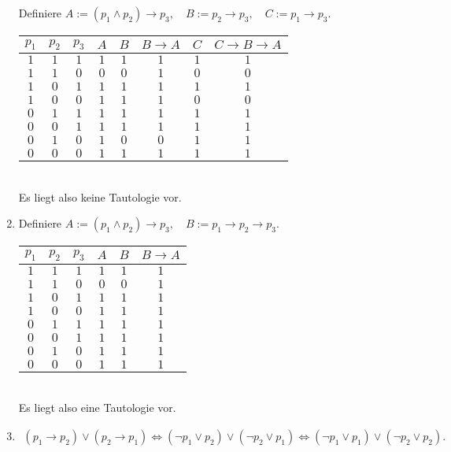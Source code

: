\begin{solution}
\begin{enumerate}[label = \alph*.]
    Definiere $A := (p_1 \land p_2) \to p_3, \quad B := p_2 \to p_3, \quad C:= p_1 \to p_3$. \\
    \begin{tabular}{|c|c|c|c|c|c|c|c|}
    \hline
    $p_1$ & $p_2$ & $p_3$ & $A$ & $B$ & $B \to A$
    & $C$ & $C \to B \to A$\\
    \hline
    $1$ & $1$ & $1$ & $1$ & $1$ & $1$ & $1$ & $1$\\
    \hline
    $1$ & $1$ & $0$ & $0$ & $0$ & $1$ & $0$ & $0$\\
    \hline
    $1$ & $0$ & $1$ & $1$ & $1$ & $1$ & $1$ & $1$\\
    \hline
    $1$ & $0$ & $0$ & $1$ & $1$ & $1$ & $0$ & $0$\\
    \hline
    $0$ & $1$ & $1$ & $1$ & $1$ & $1$ & $1$ & $1$\\
    \hline
    $0$ & $0$ & $1$ & $1$ & $1$ & $1$ & $1$ & $1$\\
    \hline
    $0$ & $1$ & $0$ & $1$ & $0$ & $0$ & $1$ & $1$\\
    \hline
    $0$ & $0$ & $0$ & $1$ & $1$ & $1$ & $1$ & $1$\\
    \hline
    \end{tabular} \\
    Es liegt also keine Tautologie vor.
    \item
    Definiere $A:= (p_1 \land p_2) \to p_3, \quad B := p_1 \to p_2 \to p_3$. \\
    \begin{tabular}{|c|c|c|c|c|c|}
    \hline
    $p_1$ & $p_2$ & $p_3$ & $A$ & $B$ & $B \to A$\\
    \hline
    $1$ & $1$ & $1$ & $1$ & $1$ & $1$\\
    \hline
    $1$ & $1$ & $0$ & $0$ & $0$ & $1$\\
    \hline
    $1$ & $0$ & $1$ & $1$ & $1$ & $1$\\
    \hline
    $1$ & $0$ & $0$ & $1$ & $1$ & $1$\\
    \hline
    $0$ & $1$ & $1$ & $1$ & $1$ & $1$\\
    \hline
    $0$ & $0$ & $1$ & $1$ & $1$ & $1$\\
    \hline
    $0$ & $1$ & $0$ & $1$ & $1$ & $1$\\
    \hline
    $0$ & $0$ & $0$ & $1$ & $1$ & $1$\\
    \hline
    \end{tabular} \\
    Es liegt also eine Tautologie vor.
    \item
    \begin{align*}
      (p_1 \to p_2) \lor (p_2 \to p_1) \iff (\neg p_1 \lor p_2) \lor (\neg p_2 \lor p_1) \iff (\neg p_1 \lor p_1) \lor (\neg p_2 \lor p_2).
    \end{align*}
\end{enumerate}

\end{solution}

